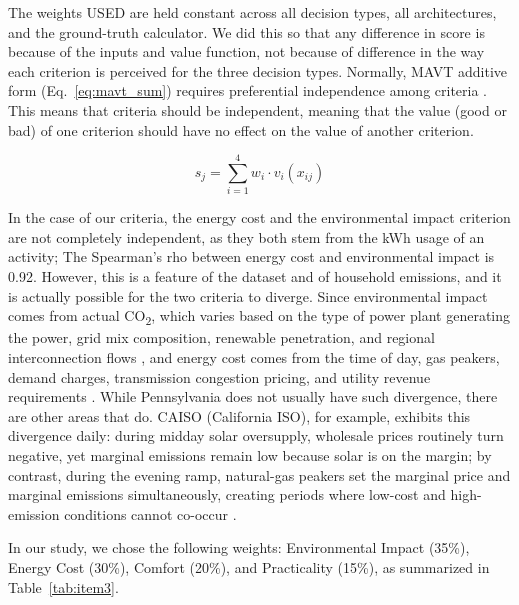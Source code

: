 \documentclass[final,3p,times]{elsarticle}
\begin{document}
The weights USED are held constant across all decision types, all architectures, and the ground-truth calculator. We did this so that any difference in score is because of the inputs and value function, not because of difference in the way each criterion is perceived for the three decision types. Normally, MAVT additive form (Eq.~\ref{eq:mavt_sum}) requires preferential independence among criteria \cite{dyer1979,keeneyraiffa1976}. This means that criteria should be independent, meaning that the value (good or bad) of one criterion should have no effect on the value of another criterion.

\begin{equation}
\label{eq:mavt_sum}
s_j = \sum_{i=1}^{4} w_i \cdot v_i(x_{ij})
\end{equation}

In the case of our criteria, the energy cost and the environmental impact criterion are not completely independent, as they both stem from the kWh usage of an activity; The Spearman's rho between energy cost and environmental impact is 0.92. However, this is a feature of the dataset and of household emissions, and it is actually possible for the two criteria to diverge. Since environmental impact comes from actual CO\textsubscript{2}, which varies based on the type of power plant generating the power, grid mix composition, renewable penetration, and regional interconnection flows \cite{pjm2022emissions}, and energy cost comes from the time of day, gas peakers, demand charges, transmission congestion pricing, and utility revenue requirements \cite{peco2021}. While Pennsylvania does not usually have such divergence, there are other areas that do. CAISO (California ISO), for example, exhibits this divergence daily: during midday solar oversupply, wholesale prices routinely turn negative, yet marginal emissions remain low because solar is on the margin; by contrast, during the evening ramp, natural-gas peakers set the marginal price and marginal emissions simultaneously, creating periods where low-cost and high-emission conditions cannot co-occur \cite{caiso2025duck,ascend2025}.

In our study, we chose the following weights: Environmental Impact (35\%), Energy Cost (30\%), Comfort (20\%), and Practicality (15\%), as summarized in Table~\ref{tab:item3}.
\end{document}
